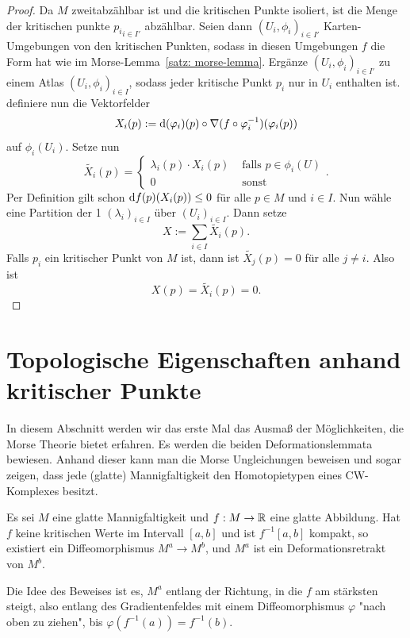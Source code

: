 \begin{proof}
    Da $M$ zweitabzählbar ist und die kritischen Punkte isoliert, ist die Menge der kritischen
    punkte ${p_i}_{i \in I'}$ abzählbar. Seien dann ${(U_i, \phi_i)}_{i \in I'}$ Karten-Umgebungen
    von den kritischen Punkten, sodass in diesen Umgebungen $f$ die Form hat wie im 
    Morse-Lemma~\ref{satz: morse-lemma}. Ergänze ${(U_i, \phi_i)}_{i \in I'}$ zu einem Atlas 
    ${(U_i, \phi_i)}_{i \in I}$, sodass jeder kritische Punkt $p_i$ nur in $U_i$ enthalten ist.
    definiere nun die Vektorfelder
    \[ X_i (p) := { \operatorname{d} } (\varphi_i) (p) \circ { \nabla } (f \circ \varphi_i^{-1}) (\varphi_i(p)) \]
    auf $\phi_i(U_i)$. Setze nun
    \[ \tilde{X_i}(p) = \begin{cases}
        \lambda_i (p) \cdot X_i(p) & \text{ falls } p \in \phi_i(U) \\
        0 & \text{ sonst }
    \end{cases} . \]
    Per Definition gilt schon ${ \operatorname{d} } f (p) (X_i(p)) \leq 0$ für alle $p \in M$ und $i \in I$.
    Nun wähle eine Partition der 1 $(\lambda_i)_{i \in I}$ über $(U_i)_{i \in I}$. Dann setze
    \[ X := \sum_{i \in I} \tilde{X_i}(p) . \]
    Falls $p_i$ ein kritischer Punkt von $M$ ist, dann ist $\tilde{X_j}(p) = 0$ 
    für alle $j \neq i$. Also ist 
    \[ X(p) = \tilde{X_i}(p) = 0 . \]
\end{proof}

\section{Topologische Eigenschaften anhand kritischer Punkte}

In diesem Abschnitt werden wir das erste Mal das Ausmaß der Möglichkeiten, die Morse Theorie 
bietet erfahren. Es werden die beiden Deformationslemmata bewiesen. Anhand dieser kann man 
die Morse Ungleichungen beweisen und sogar zeigen, dass jede (glatte) Mannigfaltigkeit
den Homotopietypen eines CW-Komplexes besitzt.

\begin{theorem}
    \label{satz: erstes deformationslemma}
    Es sei $M$ eine glatte Mannigfaltigkeit und $f: M \rightarrow { \mathbb R }$ eine
    glatte Abbildung. Hat $f$ keine kritischen Werte im Intervall $[a, b]$ und 
    ist $f^{-1}[a, b]$ kompakt, so existiert ein Diffeomorphismus 
    $M^a \rightarrow M^b$, und $M^a$ ist ein Deformationsretrakt von $M^b$.
\end{theorem}

Die Idee des Beweises ist es, $M^a$ entlang der Richtung, in die $f$ am stärksten
steigt, also entlang des Gradientenfeldes mit einem Diffeomorphismus $\varphi$ 
"nach oben zu ziehen", bis $\varphi(f^{-1}(a)) = f^{-1}(b)$.

